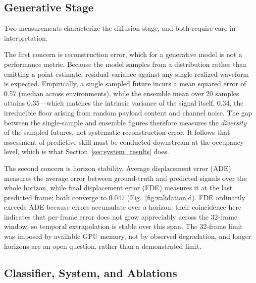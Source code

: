 \documentclass[lettersize,journal]{IEEEtran}
\begin{document}
\subsection{\textbf{Generative Stage}}
Two measurements characterize the diffusion stage, and both require care
in interpretation.

The first concern is reconstruction error, which for a generative model is
not a performance metric. Because the model samples from a distribution
rather than emitting a point estimate, residual variance against any
single realized waveform is expected. Empirically, a single sampled
future incurs a mean squared error of 0.57 (median across environments),
while the ensemble mean over 20 samples attains 0.35---which matches the
intrinsic variance of the signal itself, 0.34, the irreducible floor
arising from random payload content and channel noise. The gap between
the single-sample and ensemble figures therefore measures the
\emph{diversity} of the sampled futures, not systematic reconstruction
error. It follows that assessment of predictive skill must be conducted
downstream at the occupancy level, which is what Section~\ref{sec:system_results}
does.

The second concern is horizon stability. Average displacement error (ADE)
measures the average error between ground-truth and predicted signals over the
whole horizon, while final displacement error (FDE) measures it at the last
predicted frame; both converge to 0.047
(Fig.~\ref{fig:validation}d). FDE ordinarily exceeds ADE because errors
accumulate over a horizon; their coincidence here indicates that
per-frame error does not grow appreciably across the 32-frame window, so
temporal extrapolation is stable over this span. The 32-frame limit was
imposed by available GPU memory, not by observed degradation, and longer
horizons are an open question, rather than a demonstrated limit.

\subsection{\textbf{Classifier, System, and Ablations}}

\end{document}
